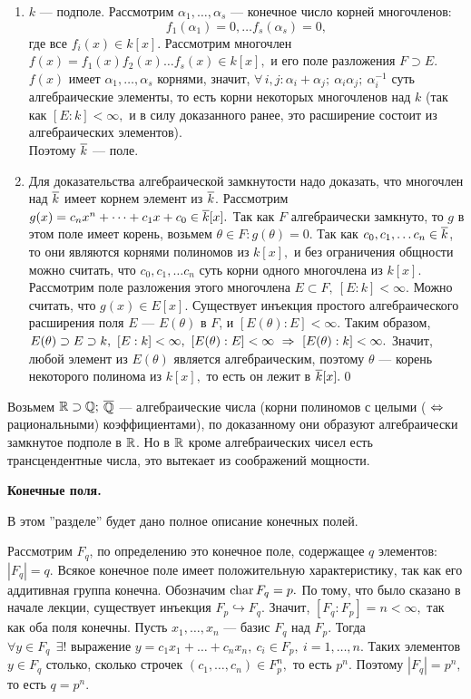 \dok \begin{enumerate}
    \item $k$ --- подполе. Рассмотрим $\alpha_1,\dots, \alpha_s$ --- конечное число корней многочленов: $$f_1(\alpha_1)=0, \dots f_s(\alpha_s)=0,$$ где все $f_i(x)\in k[x].$
    Рассмотрим многочлен $f(x)=f_1(x)f_2(x)\dots f_s(x)\in k[x],$ и его поле разложения $F\supset E.$ $f(x)$ имеет $\alpha_1,\dots,\alpha_s$ корнями, значит,
    $\forall\,i,j : \alpha_i+\alpha_j;\ \alpha_i\alpha_j;\ \alpha^{-1}_i$ суть алгебраические элементы, то есть корни некоторых многочленов над $k$ (так как $[E:k]<\infty,$ и в силу доказанного ранее, это расширение состоит из алгебраических элементов).
    \\Поэтому $\overline{k}$ --- поле.
    \item Для доказательства алгебраической замкнутости надо доказать, что многочлен над $\overline{k}$ имеет корнем элемент из $\overline{k}$.
    Рассмотрим $g(x)=c_nx^n+\dots+c_1x+c_0\in\overline{k}[x].$ Так как $F$ алгебраически замкнуто, то $g$ в этом поле имеет корень, возьмем $\theta\in F : g(\theta)=0.$
    Так как $c_0,c_1,\dots c_n\in\overline{k}$, то они являются корнями полиномов из $k[x],$ и без ограничения общности можно считать, что $c_0,c_1,\dots c_n$ суть корни одного многочлена из $k[x].$
    Рассмотрим поле разложения этого многочлена $E\subset F,\ [E:k]<\infty.$ Можно считать, что $g(x)\in E[x].$ Существует инъекция простого алгебраического расширения поля $E$ ---
    $E(\theta)$ в $F$, и $[E(\theta):E]<\infty.$ Таким образом, $E(\theta)\supset E\supset k,\ [E:k]<\infty,\ [E(\theta):E]<\infty\ra[E(\theta):k]<\infty.$ Значит, любой элемент из $E(\theta)$ является
    алгебраическим, поэтому $\theta$ --- корень некоторого полинома из $k[x],$ то есть он лежит в $\overline{k}[x].$\qquad\qed
\end{enumerate}

Возьмем $\mathbb R\supset\mathbb Q;$ $\overline{\mathbb Q}$ --- алгебраические числа (корни
полиномов с целыми ($\ \Leftrightarrow\ $рациональными)
коэффициентами), по доказанному они образуют алгебраически
замкнутое подполе в $\mathbb R$. Но в $\mathbb R$ кроме алгебраических чисел
есть трансцендентные числа, это вытекает из соображений мощности.
\medskip

\centerline{\bf Конечные поля.}

В этом ''разделе'' будет дано полное описание конечных полей.

Рассмотрим $F_q$, по определению это конечное поле, содержащее $q$ элементов: $|F_q|=q.$
Всякое конечное поле имеет положительную характеристику, так как его аддитивная группа конечна. Обозначим ${\rm char\,}F_q=p.$
По тому, что было сказано в начале лекции, существует инъекция $F_p\hookrightarrow F_q.$ Значит, $[F_q:F_p]=n<\infty,$ так как оба поля конечны.
Пусть $x_1,\dots,x_n$ --- базис $F_q$ над $F_p.$ Тогда $\forall y\in F_q \ \ \exists !\mbox{ выражение } y=c_1x_1+\dots+c_nx_n,\ c_i\in F_p,\ i=1,\dots,n.$
Таких элементов $y\in F_q$ столько, сколько строчек $(c_1,\dots,c_n)\in F_p^n,$ то есть $p^n.$ Поэтому $|F_q|=p^n,$ то есть $q=p^n.$


